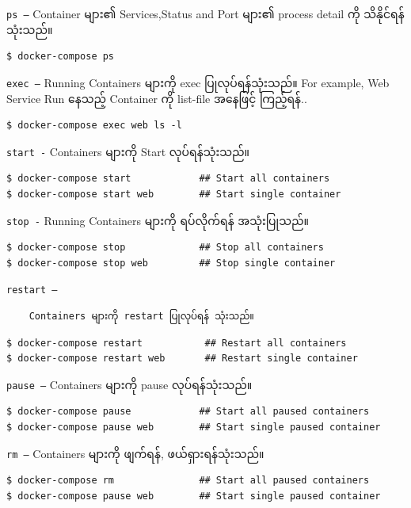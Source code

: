 \documentclass{article}
\begin{document}
\texttt{ps –} Container များ၏ Services,Status and Port များ၏ process
detail ကို သိနိုင်ရန် သုံးသည်။

\begin{verbatim}
$ docker-compose ps
\end{verbatim}

\texttt{exec –} Running Containers များကို exec ပြုလုပ်ရန်သုံးသည်။ For
example, Web Service Run နေသည့် Container ကို list-file အနေဖြင့်
ကြည့်ရန်..

\begin{verbatim}
$ docker-compose exec web ls -l
\end{verbatim}

\texttt{start -} Containers များကို Start လုပ်ရန်သုံးသည်။

\begin{verbatim}
$ docker-compose start            ## Start all containers
$ docker-compose start web        ## Start single container
\end{verbatim}

\texttt{stop -} Running Containers များကို ရပ်လိုက်ရန် အသုံးပြုသည်။

\begin{verbatim}
$ docker-compose stop             ## Stop all containers
$ docker-compose stop web         ## Stop single container
\end{verbatim}

\texttt{restart –}

\begin{verbatim}
    Containers များကို restart ပြုလုပ်ရန် သုံးသည်။
\end{verbatim}

\begin{verbatim}
$ docker-compose restart           ## Restart all containers
$ docker-compose restart web       ## Restart single container
\end{verbatim}

\texttt{pause –} Containers များကို pause လုပ်ရန်သုံးသည်။

\begin{verbatim}
$ docker-compose pause            ## Start all paused containers
$ docker-compose pause web        ## Start single paused container
\end{verbatim}

\texttt{rm –} Containers များကို ဖျက်ရန်, ဖယ်ရှားရန်သုံးသည်။

\begin{verbatim}
$ docker-compose rm               ## Start all paused containers
$ docker-compose pause web        ## Start single paused container
\end{verbatim}
\end{document}
